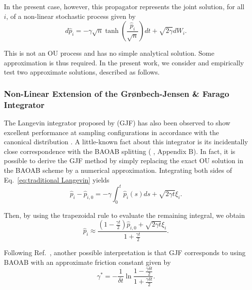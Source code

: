 \documentclass[
aip,
jcp,
reprint,
]{revtex4-1}
\newcommand{\nn}{n}
\begin{document}
In the present case, however, this propagator represents the joint solution, for all $i$, of a non-linear stochastic process given by
\begin{equation}
\label{eq:Langevin equation with new velocity}
d\hat{p}_i = - \gamma \sqrt{\nn} \tanh\left(\frac{\hat{p}_i}{\sqrt{\nn}}\right) dt + \sqrt{2 \gamma} dW_i.
\end{equation}

This is not an OU process and has no simple analytical solution.
Some approximation is thus required.
In the present work, we consider and empirically test two approximate solutions, described as follows.

\subsubsection{Non-Linear Extension of the Gr{\o}nbech-Jensen \& Farago Integrator}

The Langevin integrator proposed by \citeauthor{Gronbech-jensen_2013} \cite{Gronbech-jensen_2013} (GJF) has also been observed to show excellent performance at sampling configurations in accordance with the canonical distribution \cite{Jensen_2019, Farago_2019, Finkelstein_2019}.
A little-known fact about this integrator is its incidentally close correspondence with the BAOAB splitting (\citeauthor{Li_2017} \cite{Li_2017}, Appendix B).
In fact, it is possible to derive the GJF method by simply replacing the exact OU solution in the BAOAB scheme by a numerical approximation.
Integrating both sides of Eq.~\eqref{eq:traditional Langevin} yields
\begin{equation*}
\hat{p}_i - \hat{p}_{i,0} = - \gamma \int_0^t \hat{p}_i(s) ds + \sqrt{2 \gamma t} \xi_i.
\end{equation*}

Then, by using the trapezoidal rule to evaluate the remaining integral, we obtain
\begin{equation}
\label{eq:GJF approximation}
\hat{p}_i \approx \frac{\left(1 - \tfrac{\gamma t}{2}\right) \hat{p}_{i,0} + \sqrt{2 \gamma t} \xi_i}{1 + \tfrac{\gamma t}{2}}.
\end{equation}

Following Ref.~, another possible interpretation is that GJF corresponds to using BAOAB with an approximate friction constant given by
\begin{equation*}
\gamma^\ast = -\frac{1}{\delta t} \ln \frac{1 - \tfrac{\gamma \delta t}{2}}{1 + \tfrac{\gamma \delta t}{2}}.
\end{equation*}
\end{document}
